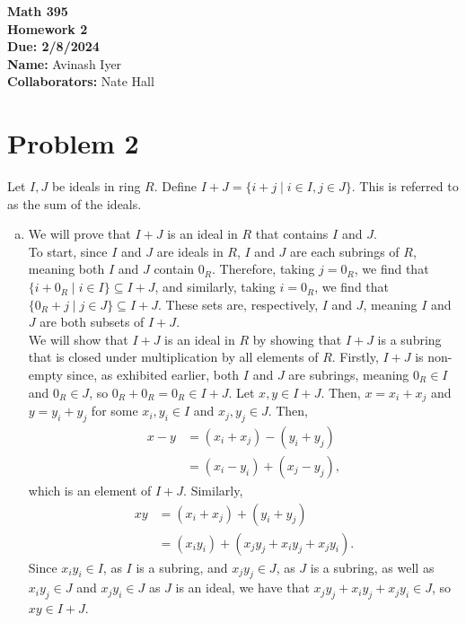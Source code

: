 \documentclass[10pt]{extarticle}
\title{}
\author{}
\date{}
\begin{document}
  \begin{center}
    {\bf \Large Math 395 \\[0.1in]Homework 2 \\[0.1in]
    Due: 2/8/2024}\\[.25in]
    {\bf Name:} {Avinash Iyer}\\[0.15in]
    {\bf Collaborators:} {Nate Hall} \\
  \end{center}
  \section{Problem 2}%
  Let $I,J$ be ideals in ring $R$. Define $I+J = \{i+j\mid i\in I,j\in J\}$. This is referred to as the sum of the ideals.
  \begin{enumerate}[(a)]
    \item We will prove that $I + J$ is an ideal in $R$ that contains $I$ and $J$.\\

      To start, since $I$ and $J$ are ideals in $R$, $I$ and $J$ are each subrings of $R$, meaning both $I$ and $J$ contain $0_R$. Therefore, taking $j = 0_R$, we find that $\{i + 0_R\mid i\in I\}\subseteq I+J$, and similarly, taking $i = 0_R$, we find that $\{0_R + j\mid j\in J\}\subseteq I+J $. These sets are, respectively, $I$ and $J$, meaning $I$ and $J$ are both subsets of $I+J$.\\

      We will show that $I+J$ is an ideal in $R$ by showing that $I+J$ is a subring that is closed under multiplication by all elements of $R$. Firstly, $I+J$ is non-empty since, as exhibited earlier, both $I$ and $J$ are subrings, meaning $0_R\in I$ and $0_R\in J$, so $0_R + 0_R = 0_R\in I+J$. Let $x,y\in I+J$. Then, $x = x_i + x_j$ and $y = y_i + y_j$ for some $x_i,y_i\in I$ and $x_j,y_j\in J$. Then,
      \begin{align*}
        x-y &= (x_i + x_j) - (y_i + y_j)\\
            &= (x_i - y_i) + (x_j - y_j),
      \end{align*}
      which is an element of $I + J$. Similarly, 
      \begin{align*}
        xy &= (x_i + x_j) + (y_i + y_j)\\
           &= (x_iy_i) + (x_jy_j + x_iy_j + x_jy_i).
      \end{align*}
      Since $x_iy_i\in I$, as $I$ is a subring, and $x_jy_j\in J$, as $J$ is a subring, as well as $x_iy_j\in J$ and $x_jy_i\in J$ as $J$ is an ideal, we have that $x_jy_j + x_iy_j + x_jy_i\in J$, so $xy\in I+J$.\\


\end{enumerate}
\end{document}
